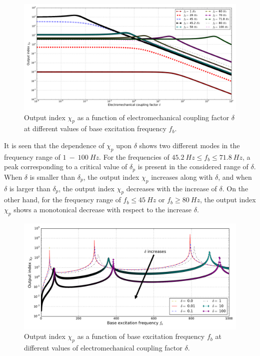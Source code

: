 \documentclass{article}
\begin{document}
\begin{figure}[!htbp]
    \centering
    \includegraphics[width=\textwidth]{./img_eig_asy/fig_sol_analytic_out_index_vs_delta}
    \caption{Output index $\chi_p$ as a function of electromechanical coupling factor $\delta$ at different values of base excitation frequency $f_b$.}
    \label{fig:fig_sol_analytic_out_index_vs_delta}
\end{figure}


It is seen that the dependence of $\chi_p$ upon $\delta$ shows two different modes in the frequency range of $1\ - \ 100\ Hz$. For the frequencies of $45.2\ Hz \leq f_b \leq 71.8\ Hz$, a peak corresponding to a critical value of $\delta_p$ is present in the considered range of $\delta$. When $\delta$ is smaller than $\delta_p$, the output index $\chi_p$ increases along with $\delta$, and when $\delta$ is larger than $\delta_p$, the output index $\chi_p$ decreases with the increase of $\delta$. On the other hand, for the frequency range of $f_b \leq 45\ Hz$ or $f_b \geq 80\ Hz$, the output index $\chi_p$ shows a monotonical decrease with respect to the increase $\delta$.


\begin{figure}[!htbp]
    \centering
    \includegraphics[width=\textwidth]{./img_eig_asy/fig_sol_analytic_out_index_vs_fr}
    \caption{Output index $\chi_p$ as a function of base excitation frequency $f_b$ at different values of electromechanical coupling factor $\delta$.}
    \label{fig:fig_sol_analytic_out_index_vs_fr}
\end{figure}
\end{document}
